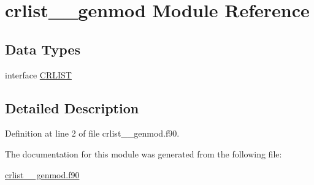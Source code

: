 \hypertarget{classcrlist____genmod}{\section{crlist\+\_\+\+\_\+genmod Module Reference}
\label{classcrlist____genmod}
}
\subsection*{Data Types}
\begin{DoxyCompactItemize}
\item 
interface \hyperlink{interfacecrlist____genmod_1_1CRLIST}{C\+R\+L\+I\+S\+T}
\end{DoxyCompactItemize}


\subsection{Detailed Description}


Definition at line 2 of file crlist\+\_\+\+\_\+genmod.\+f90.



The documentation for this module was generated from the following file\+:\begin{DoxyCompactItemize}
\item 
\hyperlink{crlist____genmod_8f90}{crlist\+\_\+\+\_\+genmod.\+f90}\end{DoxyCompactItemize}
